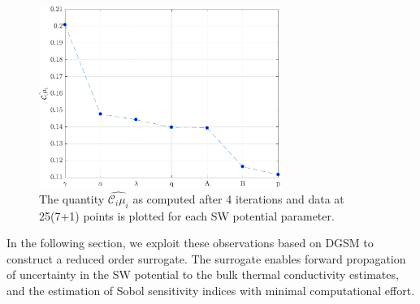 \begin{figure}[htbp]
 \begin{center}
  \includegraphics[width=0.70\textwidth]{./Figures/ub}
\caption{The quantity $\hat{\mathcal{C}_i\mu_i}$ as computed after 4 iterations and data at 25(7+1)
points is plotted for each SW potential parameter.}
\label{fig:ub}
\end{center}
\end{figure}

In the following section, we exploit these observations based on DGSM to construct a reduced order surrogate.
The surrogate enables forward propagation of uncertainty in the SW potential to the bulk thermal conductivity 
estimates, and the estimation of Sobol sensitivity indices with minimal computational effort. 




























